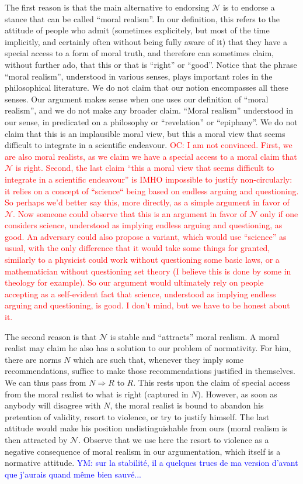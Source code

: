 \documentclass[preprint, french, english, 11pt, authoryear]{elsarticle}%
\newcommand{\commentYM}[1]{\textcolor{blue}{YM: #1}}
\newcommand{\commentOC}[1]{\textcolor{red}{OC: #1}}
\newcommand{\adv}{\mathscr{N}}
\begin{document}
The first reason is that the main alternative to endorsing $\adv$ is to endorse a stance that can be called ``moral realism''. In our definition, this refers to the attitude of people who admit (sometimes explicitely, but most of the time implicitly, and certainly often without being fully aware of it) that they have a special access to a form of moral truth, and therefore can sometimes claim, without further ado, that this or that is ``right'' or ``good''. Notice that the phrase ``moral realism'', understood in various senses, plays important roles in the philosophical literature. We do not claim that our notion encompasses all these senses. Our argument makes sense when one uses our definition of ``moral realism'', and we do not make any broader claim. ``Moral realism'' understood in our sense, in predicated on a philosophy or ``revelation'' or ``epiphany''. We do not claim that this is an implausible moral view, but this a moral view that seems difficult to integrate in a scientific endeavour. \commentOC{I am not convinced. First, we are also moral realists, as we claim we have a special access to a moral claim that $\adv$ is right. Second, the last claim “this a moral view that seems difficult to integrate in a scientific endeavour” is IMHO impossible to justify non-circularly: it relies on a concept of “science“ being based on endless arguing and questioning. So perhaps we’d better say this, more directly, as a simple argument in favor of $\adv$. Now someone could observe that this is an argument in favor of $\adv$ only if one considers science, understood as implying endless arguing and questioning, as good. An adversary could also propose a variant, which would use “science” as usual, with the only difference that it would take some things for granted, similarly to a physicist could work without questioning some basic laws, or a mathematician without questioning set theory (I believe this is done by some in theology for example). So our argument would ultimately rely on people accepting as a self-evident fact that science, understood as implying endless arguing and questioning, is good. I don’t mind, but we have to be honest about it.}

The second reason is that $\adv$ is stable and ``attracts'' moral realism. A moral realist may claim he also has a solution to our problem of normativity. For him, there are norms $N$ which are such that, whenever they imply some recommendations, suffice to make those recommendations justified in themselves. We can thus pass from $N ⇒ R$ to $R$. This rests upon the claim of special access from the moral realist to what is right (captured in $N$). However, as soon as anybody will disagree with $N$, the moral realist is bound to abandon his pretention of validity, resort to violence, or try to justify himself. The last attitude would make his position undistinguishable from ours (moral realism is then attracted by $\adv$. Observe that we use here the resort to violence as a negative consequence of moral realism in our argumentation, which itself is a normative attitude. \commentYM{sur la stabilité, il a quelques trucs de ma version d'avant que j'aurais quand même bien sauvé...}
\end{document}
